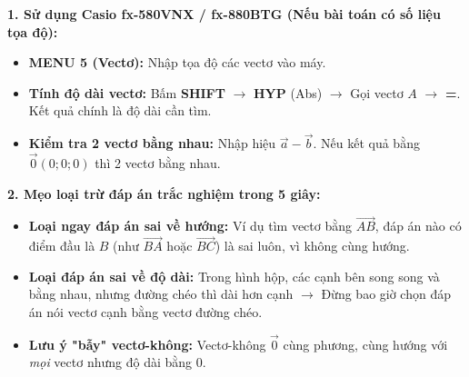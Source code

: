 \documentclass[12pt,a4paper]{article}
\begin{document}
\begin{tcolorbox}[colback=orange!5!white, colframe=myorange, title=\textbf{KHỐI 3: BÍ QUYẾT BẤM MÁY TÍNH CASIO \& MẸO LOẠI TRỪ TRẮC NGHIỆM}]
    \textbf{1. Sử dụng Casio fx-580VNX / fx-880BTG (Nếu bài toán có số liệu tọa độ):}
    \begin{itemize}[leftmargin=*, label=+]
        \item \textbf{MENU 5 (Vectơ):} Nhập tọa độ các vectơ vào máy.
        \item \textbf{Tính độ dài vectơ:} Bấm \textbf{SHIFT} $\rightarrow$ \textbf{HYP} (Abs) $\rightarrow$ Gọi vectơ \(A\) $\rightarrow$ \textbf{=}. Kết quả chính là độ dài cần tìm.
        \item \textbf{Kiểm tra 2 vectơ bằng nhau:} Nhập hiệu \(\vec{a} - \vec{b}\). Nếu kết quả bằng \(\vec{0} (0;0;0)\) thì 2 vectơ bằng nhau.
    \end{itemize}
    
    \textbf{2. Mẹo loại trừ đáp án trắc nghiệm trong 5 giây:}
    \begin{itemize}[leftmargin=*, label=+]
        \item \textbf{Loại ngay đáp án sai về hướng:} Ví dụ tìm vectơ bằng \(\overrightarrow{AB}\), đáp án nào có điểm đầu là \(B\) (như \(\overrightarrow{BA}\) hoặc \(\overrightarrow{BC}\)) là sai luôn, vì không cùng hướng.
        \item \textbf{Loại đáp án sai về độ dài:} Trong hình hộp, các cạnh bên song song và bằng nhau, nhưng đường chéo thì dài hơn cạnh $\rightarrow$ Đừng bao giờ chọn đáp án nói vectơ cạnh bằng vectơ đường chéo.
        \item \textbf{Lưu ý "bẫy" vectơ-không:} Vectơ-không \(\vec{0}\) cùng phương, cùng hướng với \textit{mọi} vectơ nhưng độ dài bằng 0.
    \end{itemize}
\end{tcolorbox}
\end{document}

